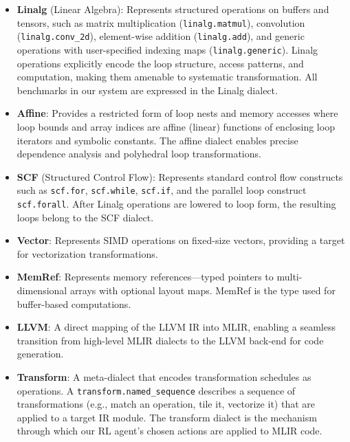 \begin{itemize}
    \item \textbf{Linalg} (Linear Algebra): Represents structured operations on buffers and tensors, such as matrix multiplication (\texttt{linalg.matmul}), convolution (\texttt{linalg.conv\_2d}), element-wise addition (\texttt{linalg.add}), and generic operations with user-specified indexing maps (\texttt{linalg.generic}). Linalg operations explicitly encode the loop structure, access patterns, and computation, making them amenable to systematic transformation. All benchmarks in our system are expressed in the Linalg dialect.

    \item \textbf{Affine}: Provides a restricted form of loop nests and memory accesses where loop bounds and array indices are affine (linear) functions of enclosing loop iterators and symbolic constants. The affine dialect enables precise dependence analysis and polyhedral loop transformations.

    \item \textbf{SCF} (Structured Control Flow): Represents standard control flow constructs such as \texttt{scf.for}, \texttt{scf.while}, \texttt{scf.if}, and the parallel loop construct \texttt{scf.forall}. After Linalg operations are lowered to loop form, the resulting loops belong to the SCF dialect.

    \item \textbf{Vector}: Represents SIMD operations on fixed-size vectors, providing a target for vectorization transformations.

    \item \textbf{MemRef}: Represents memory references—typed pointers to multi-dimensional arrays with optional layout maps. MemRef is the type used for buffer-based computations.

    \item \textbf{LLVM}: A direct mapping of the LLVM IR into MLIR, enabling a seamless transition from high-level MLIR dialects to the LLVM back-end for code generation.

    \item \textbf{Transform}: A meta-dialect that encodes transformation schedules as operations. A \texttt{transform.named\_sequence} describes a sequence of transformations (e.g., match an operation, tile it, vectorize it) that are applied to a target IR module. The transform dialect is the mechanism through which our RL agent's chosen actions are applied to MLIR code.
\end{itemize}

